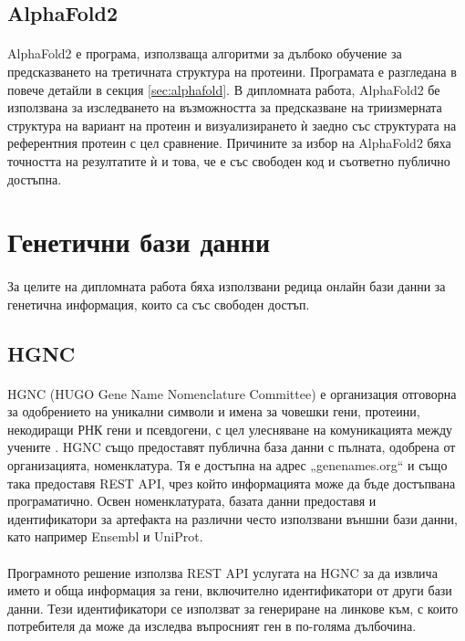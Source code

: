 \documentclass[pdftex,cyrillic,14pt,a4page,twoside,openright]{extreport}
\begin{document}
\subsection{AlphaFold2}
\paragraph{}
AlphaFold2 е програма, използваща алгоритми за дълбоко обучение за предсказването на третичната структура на протеини. Програмата е разгледана в повече детайли в секция \ref{sec:alphafold}. В дипломната работа, AlphaFold2 бе използвана за изследването на възможността за предсказване на триизмерната структура на вариант на протеин и визуализирането ѝ заедно със структурата на референтния протеин с цел сравнение. Причините за избор на AlphaFold2 бяха точността на резултатите ѝ и това, че е със свободен код и съответно публично достъпна.

\section{Генетични бази данни}
\paragraph{}
За целите на дипломната работа бяха използвани редица онлайн бази данни за генетична информация, които са със свободен достъп.

\subsection{HGNC}\label{sec:hgnc}
\paragraph{}
HGNC (HUGO Gene Name Nomenclature Committee) е организация отговорна за одобрението на уникални символи и имена за човешки гени, протеини, некодиращи РНК гени и псевдогени, с цел улесняване на комуникацията между учените \cite{povey2001hugo}. HGNC също предоставят публична база данни с пълната, одобрена от организацията, номенклатура. Тя е достъпна на адрес „genenames.org“ и също така предоставя REST API, чрез който информацията може да бъде достъпвана програматично. Освен номенклатурата, базата данни предоставя и идентификатори за артефакта на различни често използвани външни бази данни, като например Ensembl и UniProt.

\paragraph{}
Програмното решение използва REST API услугата на HGNC за да извлича името и обща информация за гени, включително идентификатори от други бази данни. Тези идентификатори се използват за генериране на линкове към, с които потребителя да може да изследва въпросният ген в по-голяма дълбочина.
\end{document}
